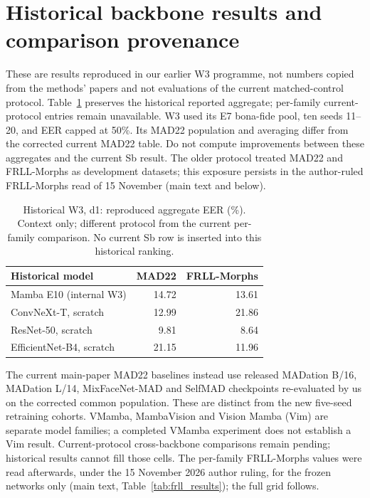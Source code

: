 \documentclass[10pt,twocolumn,letterpaper]{article}
\begin{document}
\clearpage


\section{Historical backbone results and comparison provenance}
These are results reproduced in our earlier W3 programme, not numbers copied from the methods' papers and not evaluations of the current matched-control protocol. Table~\ref{tab:historical_backbones} preserves the historical reported aggregate; per-family current-protocol entries remain unavailable. W3 used its E7 bona-fide pool, ten seeds 11--20, and EER capped at 50\%. Its MAD22 population and averaging differ from the corrected current MAD22 table. Do not compute improvements between these aggregates and the current Sb result. The older protocol treated MAD22 and FRLL-Morphs as development datasets; this exposure persists in the author-ruled FRLL-Morphs read of 15 November (main text and below).
\begin{table}[ht]
\centering\small
\caption{Historical W3, d1: reproduced aggregate EER (\%). Context only; different protocol from the current per-family comparison. No current Sb row is inserted into this historical ranking.}
\label{tab:historical_backbones}
\begin{tabular}{lrr}
\toprule
Historical model & MAD22 & FRLL-Morphs \\
\midrule
Mamba E10 (internal W3) & 14.72 & 13.61 \\
ConvNeXt-T, scratch & 12.99 & 21.86 \\
ResNet-50, scratch & 9.81 & 8.64 \\
EfficientNet-B4, scratch & 21.15 & 11.96 \\
\bottomrule
\end{tabular}
\end{table}

The current main-paper MAD22 baselines instead use released MADation B/16, MADation L/14, MixFaceNet-MAD and SelfMAD checkpoints re-evaluated by us on the corrected common population. These are distinct from the new five-seed retraining cohorts. VMamba, MambaVision and Vision Mamba (Vim) are separate model families; a completed VMamba experiment does not establish a Vim result. Current-protocol cross-backbone comparisons remain pending; historical results cannot fill those cells. The per-family FRLL-Morphs values were read afterwards, under the 15 November 2026 author ruling, for the frozen networks only (main text, Table~\ref{tab:frll_results}); the full grid follows.
\end{document}
